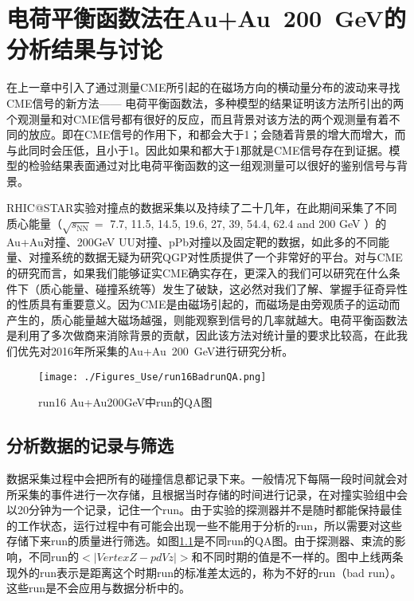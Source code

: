 
\setcounter{section}{0}

\setcounter{figure}{0}
\setcounter{table}{0}
\setcounter{equation}{0}
\chapter{ 电荷平衡函数法在Au+Au~200~GeV的分析结果与讨论}

在上一章中引入了通过测量CME所引起的在磁场方向的横动量分布的波动来寻找CME信号的新方法—— 电荷平衡函数法，多种模型的结果证明该方法所引出的两个观测量\rrest 和\rb 对CME信号都有很好的反应，而且背景对该方法的两个观测量有着不同的放应。即在CME信号的作用下，\rrest 和\rb 都会大于1；\rrest 会随着背景的增大而增大，而与此同时\rb 会压低，且小于1。因此如果\rrest 和\rb 都大于1那就是CME信号存在到证据。模型的检验结果表面通过对比电荷平衡函数的这一组观测量可以很好的鉴别信号与背景。

RHIC@STAR实验对撞点的数据采集以及持续了二十几年，在此期间采集了不同质心能量（$\sqrt{s_{\mathrm{NN}}} =  $ 7.7, 11.5, 14.5, 19.6, 27, 39, 54.4, 62.4 and 200 GeV ）的Au+Au对撞、200GeV UU对撞、pPb对撞以及固定靶的数据，如此多的不同能量、对撞系统的数据无疑为研究QGP对性质提供了一个非常好的平台。对与CME的研究而言，如果我们能够证实CME确实存在，更深入的我们可以研究在什么条件下（质心能量、碰撞系统等）发生了破缺，这必然对我们了解、掌握手征奇异性的性质具有重要意义。因为CME是由磁场引起的，而磁场是由旁观质子的运动而产生的，质心能量越大磁场越强，则能观察到信号的几率就越大。电荷平衡函数法是利用了多次做商来消除背景的贡献，因此该方法对统计量的要求比较高，在此我们优先对2016年所采集的Au+Au~200~GeV进行研究分析。

\begin{figure}[htbp]
\centering
\texttt{[image: ./Figures\_Use/run16BadrunQA.png]}
\caption{run16 Au+Au200GeV中run的QA图}
\label{fig:badrun}
\end{figure}

\section{分析数据的记录与筛选}
数据采集过程中会把所有的碰撞信息都记录下来。一般情况下每隔一段时间就会对所采集的事件进行一次存储，且根据当时存储的时间进行记录，在对撞实验组中会以20分钟为一个记录，记住一个run。由于实验的探测器并不是随时都能保持最佳的工作状态，运行过程中有可能会出现一些不能用于分析的run，所以需要对这些存储下来run的质量进行筛选。如图\ref{fig:badrun}是不同run的QA图。由于探测器、束流的影响，不同run的$<|VertexZ-pdVz|>$和不同时期的值是不一样的。图中上线两条现外的run表示是距离这个时期run的标准差太远的，称为不好的run（bad run）。这些run是不会应用与数据分析中的。





